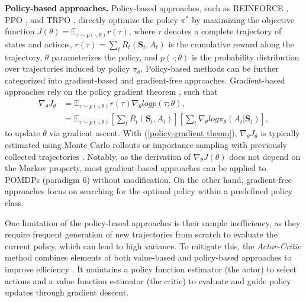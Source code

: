 \textbf{Policy-based approaches. }
Policy-based approaches, such as REINFORCE \citep{williams1992simple}, PPO  \citep{schulman2015trust}, and TRPO  \citep{schulman2017proximal}, directly optimize the policy $\pi^*$ by maximizing the objective function $J(\theta) = \mathbb{E}_{\tau\sim p(\cdot;\theta)}r(\tau)$, where $\tau$ denotes a complete trajectory of states and actions, $r(\tau) = \sum_{t} R_t(\boldsymbol{S}_t, A_t)$ is the cumulative reward along the trajectory, $\theta$ parameterizes the policy, and $p(\cdot;\theta)$ is the probability distribution over trajectories induced by policy $\pi_{\theta}$. Policy-based methods can be further categorized into gradient-based  \citep[e.g., ][]{williams1992simple,schulman2015trust,schulman2017proximal,levine2013guided,peters2008reinforcement,baxter2001infinite} and gradient-free  \citep[e.g.,][]{salimans2017evolution,koutnik2013evolving} approaches. Gradient-based approaches rely on the policy gradient theorem  \citep{williams1992simple}, such that
\begin{align}
    \nabla_{\theta}J_{\theta} &= \mathbb{E}_{\tau\sim p(\cdot;\theta)}r(\tau)\nabla_{\theta}log p(\tau;\theta),\nonumber\\
    &=\mathbb{E}_{\tau\sim p(\cdot;\theta)}\left[\sum_{t} R_t(\boldsymbol{S}_t, A_t)\right]\left[\sum_{t}\nabla_{\theta}log\pi_{\theta}(A_t|\boldsymbol{S}_t)\right],\label{policy-gradient theom}
\end{align}
to update $\theta$ via gradient ascent. 
With (\ref{policy-gradient theom}), $\nabla_{\theta}J_{\theta}$ is typically estimated using Monte Carlo rollouts  \citep{williams1992simple} or importance sampling with previously collected trajectories  \citep{levine2013guided}. Notably, as the derivation of $\nabla_{\theta}J(\theta)$ does not depend on the Markov property, most gradient-based approaches can be applied to \acrshort{POMDP}s (paradigm 6) without modification. On the other hand, gradient-free approaches focus on searching for the optimal policy within a predefined policy class. 

One limitation of the policy-based approaches is their sample inefficiency, as they require frequent generation of new trajectories from scratch to evaluate the current policy, which can lead to high variance. To mitigate this, the \textit{Actor-Critic} method combines elements of both value-based and policy-based approaches to improve efficiency \citep{sutton1999policy,mnih2016asynchronous,schulman2015high,gu2016q}. It maintains a policy function estimator (the actor) to select actions and a value function estimator (the critic) to evaluate and guide policy updates through gradient descent.

